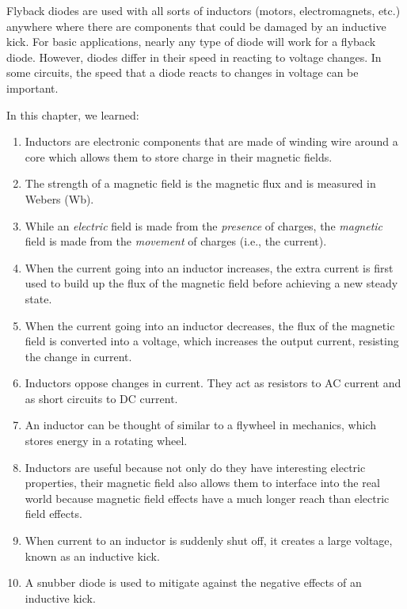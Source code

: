 Flyback diodes are used with all sorts of inductors (motors, electromagnets, etc.) anywhere where there are components that could be damaged by an inductive kick.
For basic applications, nearly any type of diode will work for a flyback diode.
However, diodes differ in their speed in reacting to voltage changes.
In some circuits, the speed that a diode reacts to changes in voltage can be important.

\reviewsection

In this chapter, we learned:

\begin{enumerate}
\item Inductors are electronic components that are made of winding wire around a core which allows them to store charge in their magnetic fields.
\item The strength of a magnetic field is the magnetic flux and is measured in Webers (Wb).
\item While an \emph{electric} field is made from the \emph{presence} of charges, the \emph{magnetic} field is made from the \emph{movement} of charges (i.e., the current).
\item When the current going into an inductor increases, the extra current is first used to build up the flux of the magnetic field before achieving a new steady state.
\item When the current going into an inductor decreases, the flux of the magnetic field is converted into a voltage, which increases the output current, resisting the change in current.
\item Inductors oppose changes in current.  They act as resistors to AC current and as short circuits to DC current.
\item An inductor can be thought of similar to a flywheel in mechanics, which stores energy in a rotating wheel.
\item Inductors are useful because not only do they have interesting electric properties, their magnetic field also allows them to interface into the real world because magnetic field effects have a much longer reach than electric field effects.
\item When current to an inductor is suddenly shut off, it creates a large voltage, known as an inductive kick.
\item A snubber diode is used to mitigate against the negative effects of an inductive kick.
\end{enumerate}

\applysection

